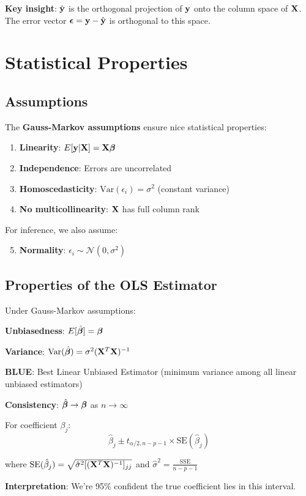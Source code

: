 \documentclass{article}
\newcounter{example}
\begin{document}
\textbf{Key insight}: $\hat{\mathbf{y}}$ is the orthogonal projection of $\mathbf{y}$ onto the column space of $\mathbf{X}$. The error vector $\boldsymbol{\epsilon} = \mathbf{y} - \hat{\mathbf{y}}$ is orthogonal to this space.

\section{Statistical Properties}

\subsection{Assumptions}

The \textbf{Gauss-Markov assumptions} ensure nice statistical properties:

\begin{enumerate}
    \item \textbf{Linearity}: $E[\mathbf{y}|\mathbf{X}] = \mathbf{X}\boldsymbol{\beta}$
    \item \textbf{Independence}: Errors are uncorrelated
    \item \textbf{Homoscedasticity}: $\text{Var}(\epsilon_i) = \sigma^2$ (constant variance)
    \item \textbf{No multicollinearity}: $\mathbf{X}$ has full column rank
\end{enumerate}

For inference, we also assume:
\begin{enumerate}
    \setcounter{enumi}{4}
    \item \textbf{Normality}: $\epsilon_i \sim \mathcal{N}(0, \sigma^2)$
\end{enumerate}

\subsection{Properties of the OLS Estimator}

Under Gauss-Markov assumptions:

\textbf{Unbiasedness}: $E[\hat{\boldsymbol{\beta}}] = \boldsymbol{\beta}$

\textbf{Variance}: $\text{Var}(\hat{\boldsymbol{\beta}}) = \sigma^2(\mathbf{X}^T\mathbf{X})^{-1}$

\textbf{BLUE}: Best Linear Unbiased Estimator (minimum variance among all linear unbiased estimators)

\textbf{Consistency}: $\hat{\boldsymbol{\beta}} \to \boldsymbol{\beta}$ as $n \to \infty$

\begin{tcolorbox}[colback=green!5!white,colframe=green!75!black,title=Example \stepcounter{example}\#\theexample: Confidence Intervals]

For coefficient $\beta_j$:
$$\hat{\beta}_j \pm t_{\alpha/2, n-p-1} \times \text{SE}(\hat{\beta}_j)$$

where $\text{SE}(\hat{\beta}_j) = \sqrt{\hat{\sigma}^2 [(\mathbf{X}^T\mathbf{X})^{-1}]_{jj}}$ and $\hat{\sigma}^2 = \frac{\text{SSE}}{n-p-1}$

\textbf{Interpretation}: We're 95\% confident the true coefficient lies in this interval.
\end{tcolorbox}
\end{document}
